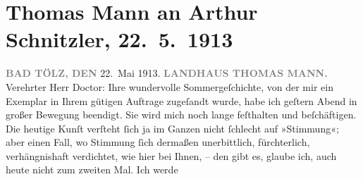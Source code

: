 

         
         \renewcommand{\erwaehntePersonen}{Personen: Alfred Kerr, Olga Schnitzler}
         \renewcommand{\erwaehnteOrte}{Orte: Bad Tölz, Thomas Mann Villa, Wien}
         \renewcommand{\erwaehnteWerke}{Werke: Der Tod in Venedig, Frau Beate und ihr Sohn. Novelle, Tagebuch}
               \section[Thomas Mann an Arthur Schnitzler, 22. 5. 1913]{ Thomas Mann an Arthur Schnitzler, 22. 5. 1913}\nopagebreak{}\rehead{ }\begin{ledgroupsized}[t]{13cm}\normalsize\beginnumbering \toendnotes[C]{\smallbreak\pagebreak[2]} 
\toendnotes[C]{\smallbreak}\pstart
           \noindent{}\raggedleft{}{\pb}\textcolor{gray}{\textbf{BAD TÖLZ, DEN}}{ }22. Mai 1913.\pend
           \pstart
           \noindent{}\raggedleft{}\textcolor{gray}{\textbf{LANDHAUS THOMAS MANN.}}\pend
           \pstart{}Verehrter Herr Doctor:\pend\pstart
           Ihre wundervolle Sommergeſchichte, von der mir ein Exemplar in Ihrem gütigen Auftrage
                    zugeſandt wurde, habe ich geſtern Abend in großer Bewegung beendigt. Sie wird
                    mich noch lange feſthalten und beſchäftigen. Die heutige Kunſt verſteht ſich ja
                    im Ganzen nicht ſchlecht auf »Stimmung«; aber einen Fall, wo Stimmung ſich
                    dermaßen unerbittlich, fürchterlich, verhängnishaft verdichtet, wie hier bei
                    Ihnen, – den gibt es, glaube ich, auch heute {\pb}nicht zum zweiten Mal. Ich werde

\end{ledgroupsized}
